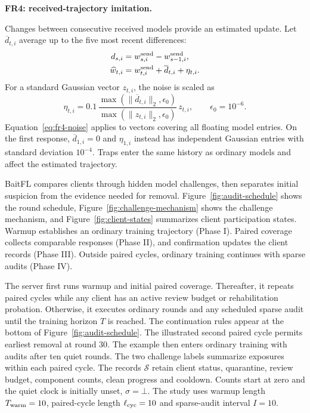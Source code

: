 \documentclass[journal]{IEEEtran}
\makeatletter
\renewcommand{\section}{\@startsection{section}{1}{\z@}{1.5ex}{0.7ex}{\normalfont\normalsize\centering\scshape}}
\makeatother
\begin{document}
\par\medskip\noindent\textbf{FR4: received-trajectory imitation.}\par\nopagebreak\smallskip\noindent
Changes between consecutive received models provide an estimated update.
Let $\overline d_{t,i}$ average up to the five most recent differences:
\begin{align}
 d_{s,i}&=w^{\rm send}_{s,i}-w^{\rm send}_{s-1,i},\\
 \widehat w_{t,i}&=w^{\rm send}_{t,i}+\overline d_{t,i}+\eta_{t,i}.
\end{align}
For a standard Gaussian vector $z_{t,i}$, the noise is scaled as
\begin{equation}\label{eq:fr4-noise}
 \eta_{t,i}=0.1\,
 \frac{\max(\|\overline d_{t,i}\|_2,\epsilon_0)}
      {\max(\|z_{t,i}\|_2,\epsilon_0)}\,z_{t,i},
 \qquad\epsilon_0=10^{-6}.
\end{equation}
Equation~\eqref{eq:fr4-noise} applies to vectors covering all floating
model entries. On the first response,
$\overline d_{1,i}=0$ and $\eta_{1,i}$ instead has independent Gaussian entries with
standard deviation $10^{-4}$. Traps enter the same history as ordinary
models and affect the estimated trajectory.


\section{Proposed Methodology}\label{sec:method}
BaitFL compares clients through hidden model challenges, then separates
initial suspicion from the evidence needed for removal.
Figure~\ref{fig:audit-schedule} shows the round schedule,
Figure~\ref{fig:challenge-mechanism} shows the challenge mechanism, and
Figure~\ref{fig:client-states} summarizes client participation states.
Warmup establishes an ordinary training trajectory
(Phase I). Paired coverage collects comparable responses
(Phase II), and confirmation updates the client records
(Phase III). Outside paired cycles, ordinary training
continues with sparse audits (Phase IV).

The server first runs warmup and initial paired coverage. Thereafter, it
repeats paired cycles while any client has an active review budget or
rehabilitation probation. Otherwise, it executes ordinary rounds and any
scheduled sparse audit until the training horizon $T$ is reached. The
continuation rules appear at the bottom of Figure~\ref{fig:audit-schedule}.
The illustrated second paired cycle permits earliest removal at round 30.
The example then enters ordinary training with audits after ten quiet rounds.
The two challenge labels summarize exposures within each paired cycle.
The records $\mathcal S$ retain client status, quarantine, review budget,
component counts, clean progress and cooldown. Counts start at zero and
the quiet clock is initially unset, $\sigma=\bot$. The study uses warmup length
$T_{\rm warm}=10$, paired-cycle length $\ell_{\rm cyc}=10$ and sparse-audit interval $I=10$.
\end{document}
